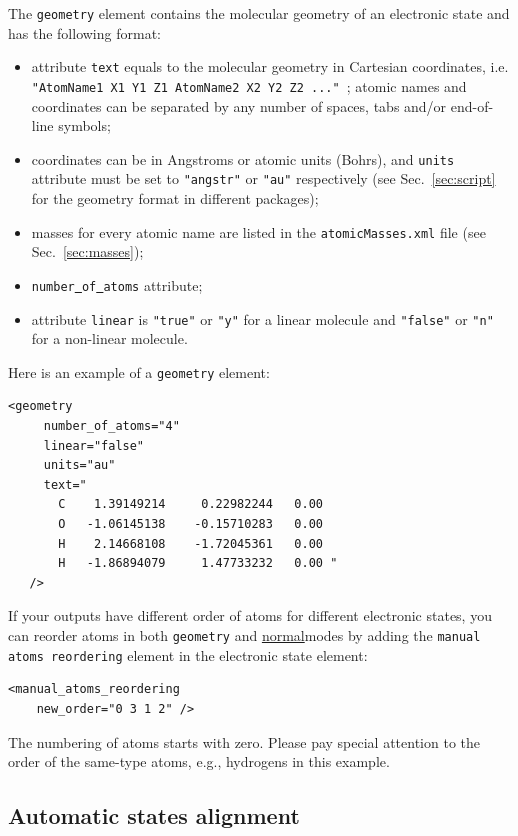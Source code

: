 \documentclass[11pt]{article}
\begin{document}
The {\tt geometry} element contains the molecular geometry of an electronic state and has the following format:
\begin{itemize}
\item attribute {\tt text} equals to the molecular geometry in Cartesian coordinates, i.e. {\tt "AtomName1 X1 Y1 Z1    AtomName2 X2 Y2 Z2 ..." };
atomic names and coordinates can be separated by any number of spaces, tabs and/or end-of-line symbols;
\item coordinates can be in Angstroms or atomic units (Bohrs), and {\tt units} attribute
must be set to {\tt "angstr"} or {\tt "au"} respectively (see Sec.~\ref{sec:script} for the geometry format in different \ai packages);
\item masses for every atomic name are listed in the {\tt atomicMasses.xml} file (see Sec.~\ref{sec:masses});
\item {\tt number\underline{~}of\underline{~}atoms} attribute; 
\item attribute {\tt linear} is {\tt "true"} or {\tt "y"} for a linear molecule 
and {\tt "false"} or {\tt "n"} for a non-linear molecule.
\end{itemize}

Here is an example of a {\tt geometry} element:
\begin{lstlisting}[frame=single,framerule=0pt]
  <geometry 
     number_of_atoms="4" 
     linear="false" 
     units="au"
     text=" 
       C    1.39149214     0.22982244   0.00
       O   -1.06145138    -0.15710283   0.00
       H    2.14668108    -1.72045361   0.00
       H   -1.86894079     1.47733232   0.00 "
   />
\end{lstlisting}

If your \ai outputs have different order of atoms for different electronic states, 
you can reorder atoms in both {\tt geometry} and \ul{normal}{modes} by adding 
the {\tt manual atoms reordering} element in the electronic state element:
\begin{lstlisting}[frame=single,framerule=0pt]
 <manual_atoms_reordering 
    new_order="0 3 1 2" />
\end{lstlisting}
The numbering of atoms starts with zero. 
Please pay special attention to the order of the same-type atoms, e.g., hydrogens in this example.


\subsection{Automatic states alignment}
\label{sec:alignment}
\end{document}
